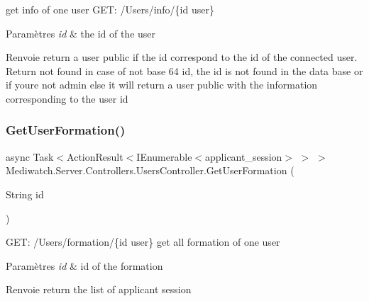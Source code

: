 get info of one user G\+ET\+: /\+Users/info/\{id user\} 


\begin{DoxyParams}{Paramètres}
{\em id} & the id of the user\\
\hline
\end{DoxyParams}
\begin{DoxyReturn}{Renvoie}
return a user public if the id correspond to the id of the connected user. Return not found in case of not base 64 id, the id is not found in the data base or if you\textquotesingle{}re not admin else it will return a user public with the information corresponding to the user id
\end{DoxyReturn}
\mbox{\label{class_mediwatch_1_1_server_1_1_controllers_1_1_users_controller_a3da0476c39418727064b44af9e007010}} 
\subsubsection{\texorpdfstring{Get\+User\+Formation()}{GetUserFormation()}}
{\footnotesize\ttfamily async Task$<$Action\+Result$<$I\+Enumerable$<$applicant\+\_\+session$>$ $>$ $>$ Mediwatch.\+Server.\+Controllers.\+Users\+Controller.\+Get\+User\+Formation (\begin{DoxyParamCaption}\item[{String}]{id }\end{DoxyParamCaption})\hspace{0.3cm}{\ttfamily [inline]}}



G\+ET\+: /\+Users/formation/\{id user\} get all formation of one user 


\begin{DoxyParams}{Paramètres}
{\em id} & id of the formation\\
\hline
\end{DoxyParams}
\begin{DoxyReturn}{Renvoie}
return the list of applicant session
\end{DoxyReturn}
\mbox{\label{class_mediwatch_1_1_server_1_1_controllers_1_1_users_controller_a5b525adc63d36869bde5021b82480228}} 
